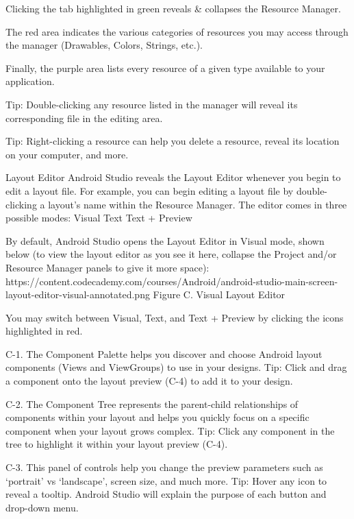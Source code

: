        Clicking the tab highlighted in green reveals & collapses the Resource Manager.

        The red area indicates the various categories of resources you may access through the manager (Drawables, Colors, Strings, etc.).

        Finally, the purple area lists every resource of a given type available to your application.

            Tip: Double-clicking any resource listed in the manager will reveal its corresponding file in the editing area.

            Tip: Right-clicking a resource can help you delete a resource, reveal its location on your computer, and more.

    Layout Editor
        Android Studio reveals the Layout Editor whenever you begin to edit a layout file. For example, you can begin editing a layout file by double-clicking a layout’s name within the Resource Manager. The editor comes in three possible modes:
            Visual
            Text
            Text + Preview
        
        By default, Android Studio opens the Layout Editor in Visual mode, shown below (to view the layout editor as you see it here, collapse the Project and/or Resource Manager panels to give it more space):
            🎨https://content.codecademy.com/courses/Android/android-studio-main-screen-layout-editor-visual-annotated.png
                Figure C. Visual Layout Editor

        You may switch between Visual, Text, and Text + Preview by clicking the icons highlighted in red.

            C-1. The Component Palette helps you discover and choose Android layout components (Views and ViewGroups) to use in your designs.    
            Tip: Click and drag a component onto the layout preview (C-4) to add it to your design.

            C-2. The Component Tree represents the parent-child relationships of components within your layout and helps you quickly focus on a specific component when your layout grows complex.
            Tip: Click any component in the tree to highlight it within your layout preview (C-4).

            C-3. This panel of controls help you change the preview parameters such as ‘portrait’ vs ‘landscape’, screen size, and much more.
            Tip: Hover any icon to reveal a tooltip.  Android Studio will explain the purpose of each button and drop-down menu.

